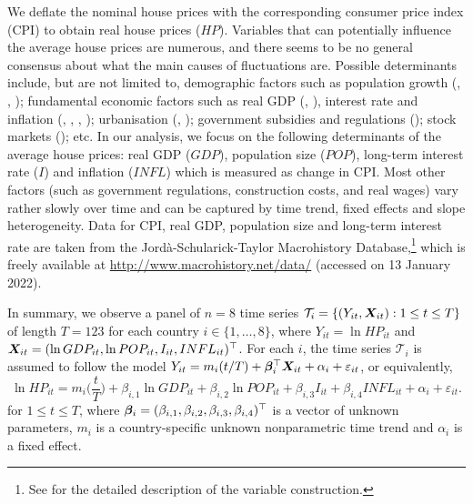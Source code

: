 \documentclass[a4paper,12pt]{article}
\begin{document}
We deflate the nominal house prices with the corresponding consumer price index (CPI) to obtain real house prices ($HP$). Variables that can potentially influence the average house prices are numerous, and there seems to be no general consensus about what the main causes of fluctuations are. Possible determinants include, but are not limited to, demographic factors such as population growth (\citealt{Holly2010}, \citealt{Wang2014}, \citealt{Churchill2021}); fundamental economic factors such as real GDP (\citealt{Huang2013}, \citealt{Churchill2021}), interest rate and inflation (\citealt{Abelson2005}, \citealt{Otto2007}, \citealt{Huang2013}, \citealt{Jorda2015}); urbanisation (\citealt{Chen2011}, \citealt{Wang2017}); government subsidies and regulations (\citealt{Malpezzi1999}); stock markets (\citealt{Gallin2006}); etc. In our analysis, we focus on the following determinants of the average house prices: real GDP ($GDP$), population size ($POP$), long-term interest rate ($I$) and inflation ($INFL$) which is measured as change in CPI. Most other factors (such as government regulations, construction costs, and real wages) vary rather slowly over time and can be captured by time trend, fixed effects and slope heterogeneity.
Data for CPI, real GDP, population size and long-term interest rate are taken from the Jordà-Schularick-Taylor Macrohistory Database,\footnote{See \cite{Jorda2017} for the detailed description of the variable construction.} which is freely available at \url{http://www.macrohistory.net/data/} (accessed on 13 January 2022).




In summary, we observe a panel of $n = 8$ time series $\mathcal{T}_i = \{(Y_{it}, \boldsymbol{X}_{it}): 1 \le t \le T \}$ of length $T = 123$ for each country $i \in \{1,\ldots, 8\}$, where $Y_{it} = \ln HP_{it}$ and $\boldsymbol{X}_{it} = (\ln GDP_{it}, \ln POP_{it}, I_{it}, INFL_{it})^\top$. For each $i$, the time series $\mathcal{T}_i$ is assumed to follow the model $Y_{it} = m_i(t/T) + \bm{\beta}^\top_i \boldsymbol{X}_{it} + \alpha_i + \varepsilon_{it}$, or equivalently, 
\begin{equation}\label{eq:model:app4}
\ln HP_{it} =  m_i \Big( \frac{t}{T} \Big) + \beta_{i, 1} \ln GDP_{it} + \beta_{i, 2} \ln POP_{it} + \beta_{i, 3} I_{it} + \beta_{i, 4} INFL_{it} + \alpha_i + \varepsilon_{it}.
\end{equation}
for $1 \le t \le T$, where $\bm{\beta}_i = (\beta_{i, 1}, \beta_{i, 2}, \beta_{i, 3}, \beta_{i, 4})^\top$ is a vector of unknown parameters, $m_i$ is a country-specific unknown nonparametric time trend and $\alpha_i$ is a fixed effect. 
\end{document}
